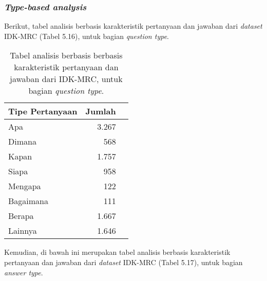 \subsubsection{\emph{Type-based analysis}}
Berikut, tabel analisis berbasis karakteristik pertanyaan dan jawaban dari \emph{dataset} IDK-MRC (Tabel 5.16), untuk bagian \emph{question type}.

\begin{table}[H]\centering
\begin{tabular}{lrr}\toprule
Tipe Pertanyaan &Jumlah \\\midrule
Apa &3.267 \\
Dimana &568 \\
Kapan &1.757 \\
Siapa &958 \\
Mengapa &122 \\
Bagaimana &111 \\
Berapa &1.667 \\
Lainnya &1.646 \\
\bottomrule
\end{tabular}
\caption{Tabel analisis berbasis berbasis karakteristik pertanyaan dan jawaban dari IDK-MRC, untuk bagian \emph{question type}.}
\end{table}

Kemudian, di bawah ini merupakan tabel analisis berbasis karakteristik pertanyaan dan jawaban dari \emph{dataset} IDK-MRC (Tabel 5.17), untuk bagian \emph{answer type}.

